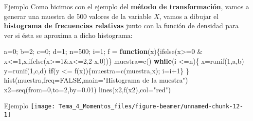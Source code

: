 \documentclass[
  ignorenonframetext,
  aspectratio=169]{beamer}
\newenvironment{Shaded}{\begin{snugshade}}{\end{snugshade}}
\newcommand{\AttributeTok}[1]{\textcolor[rgb]{0.77,0.63,0.00}{#1}}
\newcommand{\ConstantTok}[1]{\textcolor[rgb]{0.00,0.00,0.00}{#1}}
\newcommand{\ControlFlowTok}[1]{\textcolor[rgb]{0.13,0.29,0.53}{\textbf{#1}}}
\newcommand{\DecValTok}[1]{\textcolor[rgb]{0.00,0.00,0.81}{#1}}
\newcommand{\FloatTok}[1]{\textcolor[rgb]{0.00,0.00,0.81}{#1}}
\newcommand{\FunctionTok}[1]{\textcolor[rgb]{0.00,0.00,0.00}{#1}}
\newcommand{\NormalTok}[1]{#1}
\newcommand{\OtherTok}[1]{\textcolor[rgb]{0.56,0.35,0.01}{#1}}
\newcommand{\SpecialCharTok}[1]{\textcolor[rgb]{0.00,0.00,0.00}{#1}}
\newcommand{\StringTok}[1]{\textcolor[rgb]{0.31,0.60,0.02}{#1}}
\begin{document}
\begin{frame}[fragile]{Ejemplo}
\protect\hypertarget{ejemplo-10}{}
Como hicimos con el ejemplo del \textbf{método de transformación}, vamos
a generar una muestra de 500 valores de la variable \(X\), vamos a
dibujar el \textbf{histograma de frecuencias relativas} junto con la
función de densidad para ver si ésta se aproxima a dicho histograma:

\begin{Shaded}
\begin{Highlighting}[]
\NormalTok{a}\OtherTok{=}\DecValTok{0}\NormalTok{; b}\OtherTok{=}\DecValTok{2}\NormalTok{; c}\OtherTok{=}\DecValTok{0}\NormalTok{; d}\OtherTok{=}\DecValTok{1}\NormalTok{; n}\OtherTok{=}\DecValTok{500}\NormalTok{; i}\OtherTok{=}\DecValTok{1}\NormalTok{;}
\NormalTok{f }\OtherTok{=} \ControlFlowTok{function}\NormalTok{(x)\{}\FunctionTok{ifelse}\NormalTok{(x}\SpecialCharTok{\textgreater{}=}\DecValTok{0} \SpecialCharTok{\&}\NormalTok{ x}\SpecialCharTok{\textless{}=}\DecValTok{1}\NormalTok{,x,}\FunctionTok{ifelse}\NormalTok{(x}\SpecialCharTok{\textgreater{}=}\DecValTok{1}\SpecialCharTok{\&}\NormalTok{x}\SpecialCharTok{\textless{}=}\DecValTok{2}\NormalTok{,}\DecValTok{2}\SpecialCharTok{{-}}\NormalTok{x,}\DecValTok{0}\NormalTok{))\}}
\NormalTok{muestra}\OtherTok{=}\FunctionTok{c}\NormalTok{()}
\ControlFlowTok{while}\NormalTok{(i }\SpecialCharTok{\textless{}=}\NormalTok{n)\{}
\NormalTok{  x}\OtherTok{=}\FunctionTok{runif}\NormalTok{(}\DecValTok{1}\NormalTok{,a,b)}
\NormalTok{  y}\OtherTok{=}\FunctionTok{runif}\NormalTok{(}\DecValTok{1}\NormalTok{,c,d)}
  \ControlFlowTok{if}\NormalTok{(y }\SpecialCharTok{\textless{}=} \FunctionTok{f}\NormalTok{(x))\{muestra}\OtherTok{=}\FunctionTok{c}\NormalTok{(muestra,x); i}\OtherTok{=}\NormalTok{i}\SpecialCharTok{+}\DecValTok{1}\NormalTok{\}}
\NormalTok{\}}
\FunctionTok{hist}\NormalTok{(muestra,}\AttributeTok{freq=}\ConstantTok{FALSE}\NormalTok{,}\AttributeTok{main=}\StringTok{"Histograma de la muestra"}\NormalTok{)}
\NormalTok{x2}\OtherTok{=}\FunctionTok{seq}\NormalTok{(}\AttributeTok{from=}\DecValTok{0}\NormalTok{,}\AttributeTok{to=}\DecValTok{2}\NormalTok{,}\AttributeTok{by=}\FloatTok{0.01}\NormalTok{)}
\FunctionTok{lines}\NormalTok{(x2,}\FunctionTok{f}\NormalTok{(x2),}\AttributeTok{col=}\StringTok{"red"}\NormalTok{)}
\end{Highlighting}
\end{Shaded}
\end{frame}

\begin{frame}{Ejemplo}
\protect\hypertarget{ejemplo-11}{}
\texttt{[image: Tema\_4\_Momentos\_files/figure-beamer/unnamed-chunk-12-1]}
\end{frame}
\end{document}
